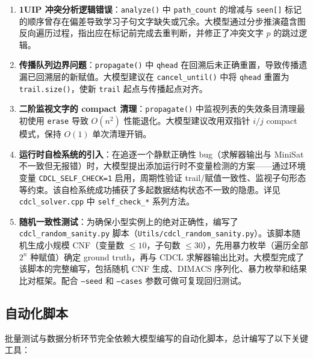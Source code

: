 \documentclass[12pt,a4paper]{article}
\begin{document}
\begin{enumerate}[label=(\arabic*)]
    \item \textbf{1UIP 冲突分析逻辑错误}：\texttt{analyze()} 中 \texttt{path\_count} 的增减与 \texttt{seen[]} 标记的顺序曾存在偏差导致学习子句文字缺失或冗余。大模型通过分步推演蕴含图反向遍历过程，指出应在标记前完成去重判断，并修正了冲突文字 $p$ 的跳过逻辑。

    \item \textbf{传播队列边界问题}：\texttt{propagate()} 中 \texttt{qhead} 在回溯后未正确重置，导致传播遗漏已回溯层的新赋值。大模型建议在 \texttt{cancel\_until()} 中将 \texttt{qhead} 重置为 \texttt{trail.size()}，使新 \texttt{trail} 起点与传播起点对齐。

    \item \textbf{二阶监视文字的 compact 清理}：\texttt{propagate()} 中监视列表的失效条目清理最初使用 \texttt{erase} 导致 $O(n^2)$ 性能退化。大模型建议改用双指针 $i/j$ compact 模式，保持 $O(1)$ 单次清理开销。

    \item \textbf{运行时自检系统的引入}：在追逐一个静默正确性 bug（求解器输出与 MiniSat 不一致但无报错）时，大模型提出添加运行时不变量检测的方案——通过环境变量 \texttt{CDCL\_SELF\_CHECK=1} 启用，周期性验证 trail/赋值一致性、监视子句形态等约束。该自检系统成功捕获了多起数据结构状态不一致的隐患。详见 \texttt{cdcl\_solver.cpp} 中 \texttt{self\_check\_*} 系列方法。

    \item \textbf{随机一致性测试}：为确保小型实例上的绝对正确性，编写了 \texttt{cdcl\_random\_sanity.py} 脚本（\texttt{Utils/cdcl\_random\_sanity.py}）。该脚本随机生成小规模 CNF（变量数 $\leq 10$，子句数 $\leq 30$），先用暴力枚举（遍历全部 $2^n$ 种赋值）确定 ground truth，再与 CDCL 求解器输出比对。大模型完成了该脚本的完整编写，包括随机 CNF 生成、DIMACS 序列化、暴力枚举和结果比对框架。配合 \texttt{--seed} 和 \texttt{--cases} 参数可做可复现回归测试。
\end{enumerate}

\subsection{自动化脚本}

批量测试与数据分析环节完全依赖大模型编写的自动化脚本，总计编写了以下关键工具：
\end{document}
